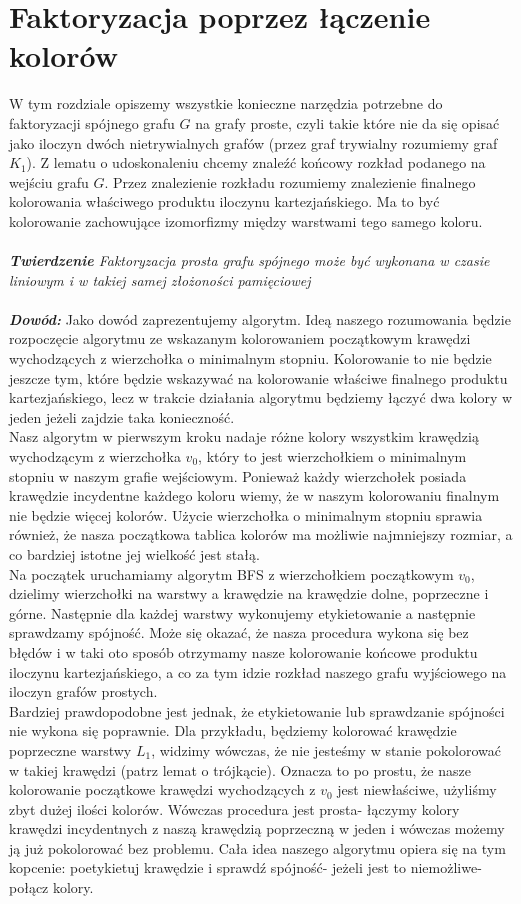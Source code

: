 \documentclass[12pt,a4paper,titlepage]{article}
\begin{document}
\section{Faktoryzacja poprzez łączenie kolorów}
W tym rozdziale opiszemy wszystkie konieczne narzędzia potrzebne do faktoryzacji spójnego grafu $G$ na grafy proste, czyli takie które nie da się opisać jako iloczyn dwóch nietrywialnych grafów (przez graf trywialny rozumiemy graf $K_1$). Z lematu o udoskonaleniu chcemy znaleźć końcowy rozkład podanego na wejściu grafu $G$. Przez znalezienie rozkładu rozumiemy znalezienie finalnego kolorowania właściwego produktu iloczynu kartezjańskiego. Ma to być kolorowanie zachowujące izomorfizmy między warstwami tego samego koloru.\\
\\
\textit{\textbf{Twierdzenie} Faktoryzacja prosta grafu spójnego może być wykonana w czasie liniowym i w takiej samej złożoności pamięciowej}\\
\\
\textit{\textbf{Dowód:}} Jako dowód zaprezentujemy algorytm. Ideą naszego rozumowania będzie rozpoczęcie algorytmu ze wskazanym kolorowaniem początkowym krawędzi wychodzących z wierzchołka o minimalnym stopniu. Kolorowanie to nie będzie jeszcze tym, które będzie wskazywać na kolorowanie właściwe finalnego produktu kartezjańskiego, lecz w trakcie działania algorytmu będziemy łączyć dwa kolory w jeden jeżeli zajdzie taka konieczność. \\
Nasz algorytm w pierwszym kroku nadaje różne kolory wszystkim krawędzią wychodzącym z wierzchołka $v_0$, który to jest wierzchołkiem o minimalnym stopniu w naszym grafie wejściowym. Ponieważ każdy wierzchołek posiada krawędzie incydentne każdego koloru wiemy, że w naszym kolorowaniu finalnym nie będzie więcej kolorów. Użycie wierzchołka o minimalnym stopniu sprawia również, że nasza początkowa tablica kolorów ma możliwie najmniejszy rozmiar, a co bardziej istotne jej wielkość jest stałą. \\
Na początek uruchamiamy algorytm BFS z wierzchołkiem początkowym $v_0$, dzielimy wierzchołki na warstwy a krawędzie na krawędzie dolne, poprzeczne i górne. Następnie dla każdej warstwy wykonujemy etykietowanie a następnie sprawdzamy spójność. Może się okazać, że nasza procedura wykona się bez błędów i w taki oto sposób otrzymamy nasze kolorowanie końcowe produktu iloczynu kartezjańskiego, a co za tym idzie rozkład naszego grafu wyjściowego na iloczyn grafów prostych.\\
Bardziej prawdopodobne jest jednak, że etykietowanie lub sprawdzanie spójności nie wykona się poprawnie. Dla przykładu, będziemy kolorować krawędzie poprzeczne warstwy $L_1$, widzimy wówczas, że nie jesteśmy w stanie pokolorować w takiej krawędzi (patrz lemat o trójkącie). Oznacza to po prostu, że nasze kolorowanie początkowe krawędzi wychodzących z $v_0$ jest niewłaściwe, użyliśmy zbyt dużej ilości kolorów. Wówczas procedura jest prosta- łączymy kolory krawędzi incydentnych z naszą krawędzią poprzeczną w jeden i wówczas możemy ją już pokolorować bez problemu. Cała idea naszego algorytmu opiera się na tym kopcenie: poetykietuj krawędzie i sprawdź spójność- jeżeli jest to niemożliwe- połącz kolory. \\
\end{document}
